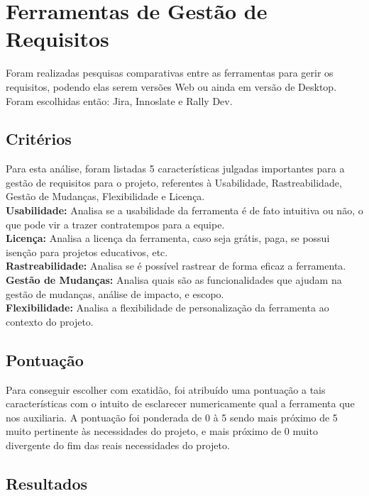 \chapter[Ferramentas de Gestão de Requisitos]{Ferramentas de Gestão de Requisitos}

\tab Foram realizadas pesquisas comparativas entre as ferramentas para gerir os requisitos, podendo elas serem versões Web ou ainda em versão de Desktop. Foram escolhidas então: Jira, Innoslate e Rally Dev.\\

\section {\large{Critérios}}

\tab Para esta análise, foram listadas 5 características julgadas importantes para a gestão de requisitos para o projeto, referentes à Usabilidade, Rastreabilidade, Gestão de Mudanças, Flexibilidade e Licença.\\
\tab \textbf{Usabilidade:} Analisa se a usabilidade da ferramenta é de fato intuitiva ou não, o que pode vir a trazer contratempos para a equipe.\\
\tab \textbf{Licença:} Analisa a licença da ferramenta, caso seja grátis, paga, se possui isenção para projetos educativos, etc.\\
\tab \textbf{Rastreabilidade:} Analisa se é possível rastrear de forma eficaz a ferramenta.\\
\tab \textbf{Gestão de Mudanças:} Analisa quais são as funcionalidades que ajudam na gestão de mudanças, análise de impacto, e escopo.\\
\tab \textbf{Flexibilidade:} Analisa a flexibilidade de personalização da ferramenta ao contexto do projeto.\\

\section {\large{Pontuação}}

\tab Para conseguir escolher com exatidão, foi atribuído uma pontuação a tais características com o intuito de esclarecer numericamente qual a ferramenta que nos auxiliaria. A pontuação foi ponderada de 0 à 5 sendo mais próximo de 5 muito pertinente às necessidades do projeto, e mais próximo de 0 muito divergente do fim das reais necessidades do projeto.\\

\section {\large{Resultados}}

